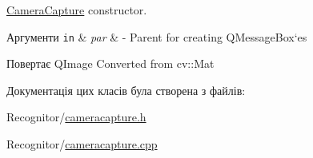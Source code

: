 \hyperlink{classCameraCapture}{Camera\-Capture} constructor. 


\begin{DoxyParams}[1]{Аргументи}
\mbox{\tt in}  & {\em par} & -\/ Parent for creating Q\-Message\-Box`es\\
\hline
\end{DoxyParams}
\begin{DoxyReturn}{Повертає}
Q\-Image Converted from cv\-::\-Mat 
\end{DoxyReturn}


Документація цих класів була створена з файлів\-:\begin{DoxyCompactItemize}
\item 
Recognitor/\hyperlink{cameracapture_8h}{cameracapture.\-h}\item 
Recognitor/\hyperlink{cameracapture_8cpp}{cameracapture.\-cpp}\end{DoxyCompactItemize}
